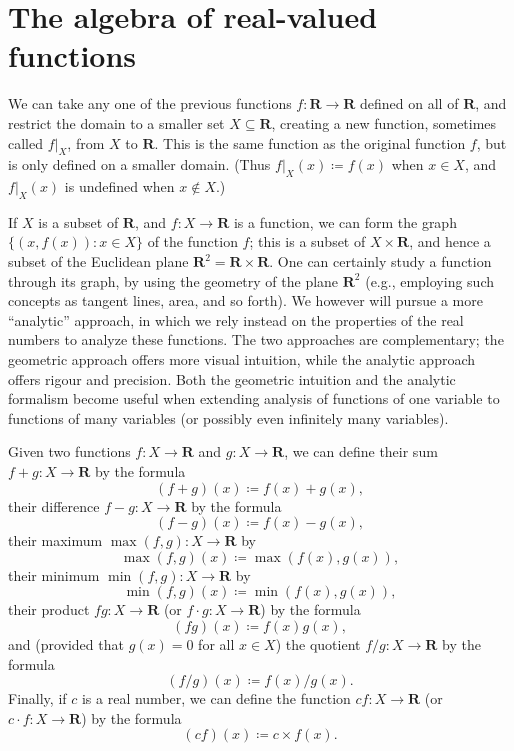 \section{The algebra of real-valued functions}\label{sec 9.2}

\begin{note}
    We can take any one of the previous functions \(f : \mathbf{R} \to \mathbf{R}\) defined on all of \(\mathbf{R}\), and restrict the domain to a smaller set \(X \subseteq \mathbf{R}\), creating a new function, sometimes called \(f|_X\), from \(X\) to \(\mathbf{R}\).
    This is the same function as the original function \(f\), but is only defined on a smaller domain.
    (Thus \(f|_X(x) \coloneqq f(x)\) when \(x \in X\), and \(f|_X(x)\) is undefined when \(x \notin X\).)
\end{note}

\begin{note}
    If \(X\) is a subset of \(\mathbf{R}\), and \(f : X \to \mathbf{R}\) is a function, we can form the graph \(\{(x, f(x)) : x \in X\}\) of the function \(f\);
    this is a subset of \(X \times \mathbf{R}\), and hence a subset of the Euclidean plane \(\mathbf{R}^2 = \mathbf{R} \times \mathbf{R}\).
    One can certainly study a function through its graph, by using the geometry of the plane \(\mathbf{R}^2\)
    (e.g., employing such concepts as tangent lines, area, and so forth).
    We however will pursue a more ``analytic'' approach, in which we rely instead on the properties of the real numbers to analyze these functions.
    The two approaches are complementary;
    the geometric approach offers more visual intuition, while the analytic approach offers rigour and precision.
    Both the geometric intuition and the analytic formalism become useful when extending analysis of functions of one variable to functions of many variables
    (or possibly even infinitely many variables).
\end{note}

\begin{definition}\label{9.2.1}
    Given two functions \(f : X \to \mathbf{R}\) and \(g : X \to \mathbf{R}\), we can define their sum \(f + g : X \to \mathbf{R}\) by the formula
    \[
        (f + g)(x) \coloneqq f(x) + g(x),
    \]
    their difference \(f - g : X \to \mathbf{R}\) by the formula
    \[
        (f - g)(x) \coloneqq f(x) - g(x),
    \]
    their maximum \(\max(f, g) : X \to \mathbf{R}\) by
    \[
        \max(f, g)(x) \coloneqq \max(f(x), g(x)),
    \]
    their minimum \(\min(f, g) : X \to \mathbf{R}\) by
    \[
        \min(f, g)(x) \coloneqq \min(f(x), g(x)),
    \]
    their product \(fg : X \to \mathbf{R}\) (or \(f \cdot g : X \to \mathbf{R}\)) by the formula
    \[
        (fg)(x) \coloneqq f(x)g(x),
    \]
    and (provided that \(g(x) = 0\) for all \(x \in X\)) the quotient \(f / g : X \to \mathbf{R}\) by the formula
    \[
        (f / g)(x) \coloneqq f(x) / g(x).
    \]
    Finally, if \(c\) is a real number, we can define the function \(cf : X \to \mathbf{R}\) (or \(c \cdot f : X \to \mathbf{R}\)) by the formula
    \[
        (cf)(x) \coloneqq c \times f(x).
    \]
\end{definition}